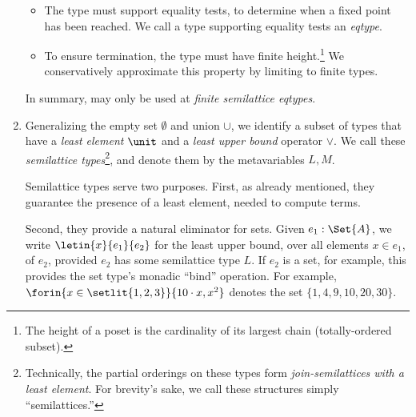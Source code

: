 \begin{enumerate}
\begin{itemize}
  \item The type must support equality tests, to determine when a fixed point
    has been reached. We call a type supporting equality tests an \emph{eqtype}.

  \item To ensure termination, the type must have finite height.\footnote{The
    height of a poset is the cardinality of its largest chain (totally-ordered
    subset).} We conservatively approximate this property by limiting 
    to finite types.
  \end{itemize}

  In summary,  may only be used at \emph{finite semilattice eqtypes}.



\item\label{item:semilattice-types} Generalizing the empty set $\emptyset$ and
  union $\cup$, we identify a subset of types that have a \emph{least element}
  $\unit$ and a \emph{least upper bound} operator $\vee$. We call these
  \emph{semilattice types}\footnote{Technically, the partial orderings on these
    types form \emph{join-semilattices with a least element}. For brevity's
    sake, we call these structures simply ``semilattices.''}, and denote them by
  the metavariables $L,M$.

  Semilattice types serve two purposes. First, as already mentioned, they
  guarantee the presence of a least element, needed to compute  terms.


  Second, they provide a natural eliminator for sets. Given $e_1 : \Set{A}$, we
  write $\letin{x}{e_1}{e_2}$ for the least upper bound, over all elements $x
  \in e_1$, of $e_2$, provided $e_2$ has some semilattice type $L$. If $e_2$ is
  a set, for example, this provides the set type's monadic ``bind'' operation.
  For example, $\forin{x \in \setlit{1,2,3}} \{10 \cdot x, x^2\}$ denotes the
  set $\{1, 4, 9, 10, 20, 30\}$.

\end{enumerate}
